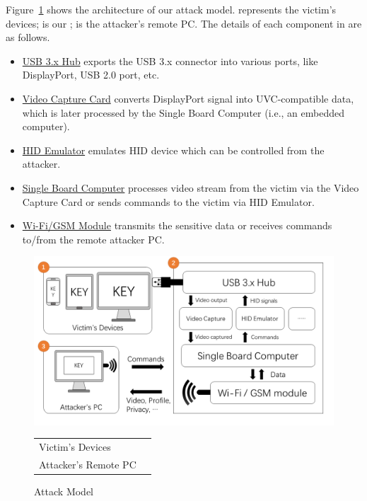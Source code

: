 Figure~\ref{fig:attack_model} shows the architecture of our attack model.  represents the victim's devices;  is our \tool;  is the attacker's remote PC. The details of each component in \tool are as follows.


\begin{itemize}
	
	\item\underline{USB 3.x Hub} exports the USB 3.x connector into various ports, like DisplayPort, USB 2.0 port, etc.
	
	\item\underline{Video Capture Card} converts DisplayPort signal into UVC-compatible data, which is later processed by the Single Board Computer (i.e., an embedded computer).
	
	\item\underline{HID Emulator} emulates HID device which can be controlled from the attacker.
	
	\item\underline{Single Board Computer} processes video stream from the victim via the Video Capture Card or sends commands to the victim via HID Emulator.
	
	\item\underline{Wi-Fi/GSM Module} transmits the sensitive data or receives commands to/from the remote attacker PC.

\end{itemize}


\begin{figure}[t]
	\centering
	\includegraphics[width=\linewidth]{./Figs/attack_model.png}

	\begin{tabular}{ll}
	\mycircled{1} Victim's Devices    &\mycircled{2}\tool\\
	\mycircled{3} Attacker's Remote PC
	\end{tabular}

	\caption{Attack Model}%
	\label{fig:attack_model}
\end{figure}

